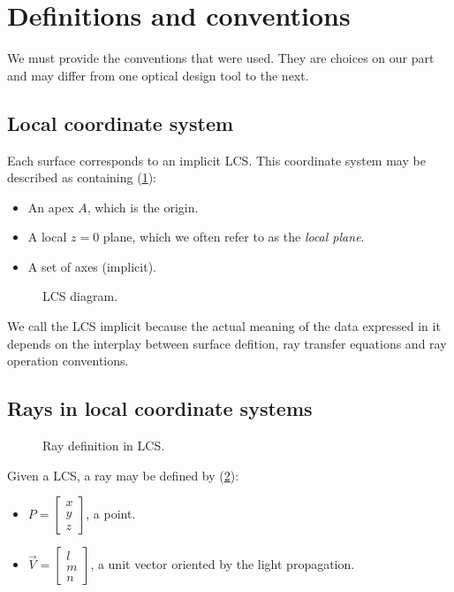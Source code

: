 \section{Definitions and conventions}
We must provide the conventions that were used. They are choices
on our part and may differ from one optical design tool to the next.

\subsection{Local coordinate system} \label{sec:LCS}
Each surface corresponds to an implicit \gls{LCS}.
This coordinate system may be described as containing (\cref{fig:LCS}):

\begin{itemize}
\item An apex $A$, which is the origin.
\item A local $z=0$ plane, which we often refer to as the \emph{local plane}.
\item A set of axes (implicit).
\end{itemize}

\begin{figure} \caption{\label{fig:LCS} LCS diagram.}

\end{figure}

We call the \gls{LCS} implicit because the actual meaning of the data
expressed in it depends on the interplay between surface defition, ray
transfer equations and ray operation conventions.

\subsection{Rays in local coordinate systems}

\begin{figure} \caption{\label{fig:ray-in-LCS} Ray definition
in \gls{LCS}.}

\end{figure}

Given a \gls{LCS}, a ray may be defined by (\cref{fig:ray-in-LCS}):
\begin{itemize}
\item $P = \begin{bmatrix}x \\ y \\ z \end{bmatrix}$, a point.
\item $\overrightarrow{V} = \begin{bmatrix} l \\ m \\ n \end{bmatrix}$, a unit
vector oriented by the light propagation.
\end{itemize}

